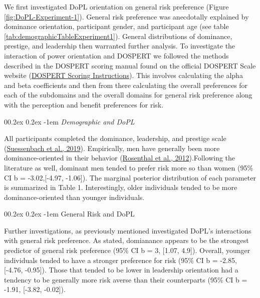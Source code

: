 \documentclass[
  donotrepeattitle,doc, 12pt, a4paper,floatsintext]{apa7}
\makeatletter
\let\oldparagraph\paragraph
\renewcommand{\paragraph}[1]{\oldparagraph{#1}\mbox{}}
\renewcommand{\paragraph}{\@startsection{paragraph}{4}{\parindent}%
  {0\baselineskip \@plus 0.2ex \@minus 0.2ex}%
  {-1em}%
  {\normalfont\normalsize\bfseries\itshape\typesectitle}}
\makeatother
\begin{document}
We first investigated DoPL orientation on general risk preference (Figure \ref{fig:DoPL-Experiment-1}). General risk preference was anecdotally explained by dominance orientation, participant gender, and participant age (see table \ref{tab:demographicTableExperiment1}). General distributions of dominance, prestige, and leadership then warranted further analysis. To investigate the interaction of power orientation and DOSPERT we followed the methods described in the DOSPERT scoring manual found on the official DOSPERT Scale website (\href{https://sites.google.com/a/decisionsciences.columbia.edu/dospert/scoring-instructions}{DOSPERT Scoring Instructions}). This involves calculating the alpha and beta coefficients and then from there calculating the overall preferences for each of the subdomains and the overall domains for general risk preference along with the perception and benefit preferences for risk.

\hypertarget{demographic-and-dopl}{%
\paragraph{\texorpdfstring{\emph{Demographic and DoPL}}{Demographic and DoPL}}\label{demographic-and-dopl}}

All participants completed the dominance, leadership, and prestige scale (\protect\hyperlink{ref-suessenbach2019}{Suessenbach et al., 2019}). Empirically, men have generally been more dominance-oriented in their behavior (\protect\hyperlink{ref-rosenthal2012}{Rosenthal et al., 2012}).Following the literature as well, dominant men tended to prefer risk more so than women (95\% CI b = -3.02,{[}-4.97, -1.06{]}). The marginal posterior distribution of each parameter is summarized in Table 1. Interestingly, older individuals tended to be more dominance-oriented than younger individuals.

\hypertarget{general-risk-and-dopl}{%
\paragraph{General Risk and DoPL}\label{general-risk-and-dopl}}

Further investigations, as previously mentioned investigated DoPL's interactions with general risk preference. As stated, domianance appears to be the strongest predictor of general risk preference (95\% CI b = 3, {[}1.07, 4.9{]}). Overall, younger individuals tended to have a stronger preference for risk (95\% CI b = -2.85, {[}-4.76, -0.95{]}). Those that tended to be lower in leadership orientation had a tendency to be generally more risk averse than their counterparts (95\% CI b = -1.91, {[}-3.82, -0.02{]}).
\end{document}
